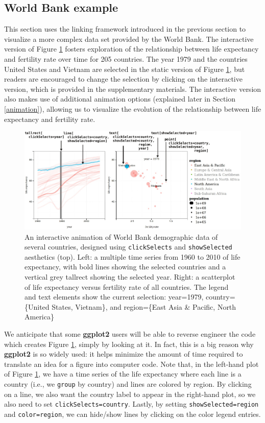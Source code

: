 \documentclass[12pt,]{article}
\theoremstyle{definition}
\theoremstyle{definition}
\theoremstyle{definition}
\theoremstyle{remark}
\begin{document}
\hypertarget{worldbank}{%
\subsection{World Bank example}\label{worldbank}}

This section uses the linking framework introduced in the previous
section to visualize a more complex data set provided by the World Bank.
The interactive version of Figure \ref{fig:worldbank} fosters
exploration of the relationship between life expectancy and fertility
rate over time for 205 countries. The year 1979 and the countries United
States and Vietnam are selected in the static version of Figure
\ref{fig:worldbank}, but readers are encouraged to change the selection
by clicking on the interactive version, which is provided in the
supplementary materials. The interactive version also makes use of
additional animation options (explained later in Section
\ref{animation}), allowing us to visualize the evolution of the
relationship between life expectancy and fertility rate.

\begin{figure}
\centering
\includegraphics{images/figure-1}
\caption{\label{fig:worldbank}An interactive animation of World Bank
demographic data of several countries, designed using
\texttt{clickSelects} and \texttt{showSelected} aesthetics (top). Left:
a multiple time series from 1960 to 2010 of life expectancy, with bold
lines showing the selected countries and a vertical grey tallrect
showing the selected year. Right: a scatterplot of life expectancy
versus fertility rate of all countries. The legend and text elements
show the current selection: year=1979, country=\{United States,
Vietnam\}, and region=\{East Asia \& Pacific, North America\}}
\end{figure}

We anticipate that some \textbf{ggplot2} users will be able to reverse
engineer the code which creates Figure \ref{fig:worldbank}, simply by
looking at it. In fact, this is a big reason why \textbf{ggplot2} is so
widely used: it helps minimize the amount of time required to translate
an idea for a figure into computer code. Note that, in the left-hand
plot of Figure \ref{fig:worldbank}, we have a time series of the life
expectancy where each line is a country (i.e., we \texttt{group} by
country) and lines are colored by region. By clicking on a line, we also
want the country label to appear in the right-hand plot, so we also need
to set \texttt{clickSelects=country}. Lastly, by setting
\texttt{showSelected=region} and \texttt{color=region}, we can hide/show
lines by clicking on the color legend entries.
\end{document}

